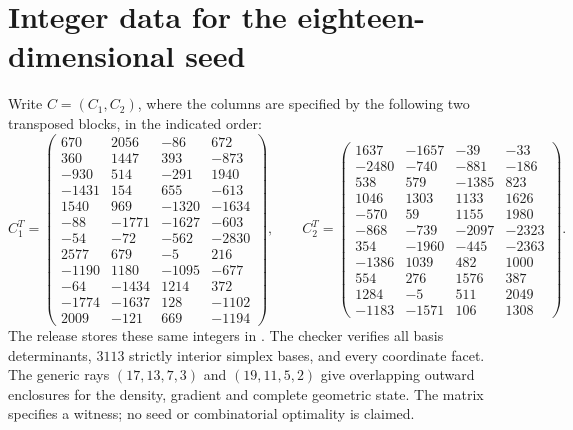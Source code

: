 \documentclass[11pt]{article}
\begin{document}
\section{Integer data for the eighteen-dimensional seed}\label{app:integer-seed}
Write $C=(C_1,C_2)$, where the columns are specified by the following
two transposed blocks, in the indicated order:
\[
 C_1^T=\begin{pmatrix}
670 & 2056 & -86 & 672\\
360 & 1447 & 393 & -873\\
-930 & 514 & -291 & 1940\\
-1431 & 154 & 655 & -613\\
1540 & 969 & -1320 & -1634\\
-88 & -1771 & -1627 & -603\\
-54 & -72 & -562 & -2830\\
2577 & 679 & -5 & 216\\
-1190 & 1180 & -1095 & -677\\
-64 & -1434 & 1214 & 372\\
-1774 & -1637 & 128 & -1102\\
2009 & -121 & 669 & -1194
\end{pmatrix},\qquad
 C_2^T=\begin{pmatrix}
1637 & -1657 & -39 & -33\\
-2480 & -740 & -881 & -186\\
538 & 579 & -1385 & 823\\
1046 & 1303 & 1133 & 1626\\
-570 & 59 & 1155 & 1980\\
-868 & -739 & -2097 & -2323\\
354 & -1960 & -445 & -2363\\
-1386 & 1039 & 482 & 1000\\
554 & 276 & 1576 & 387\\
1284 & -5 & 511 & 2049\\
-1183 & -1571 & 106 & 1308
\end{pmatrix}.
\]
The release stores these same integers in
. The checker verifies all basis
determinants, $3113$ strictly interior simplex bases, and every coordinate
facet. The generic rays $(17,13,7,3)$ and $(19,11,5,2)$ give overlapping
outward enclosures for the density, gradient and complete geometric state.
The matrix specifies a witness; no seed or combinatorial optimality is claimed.
\end{document}

